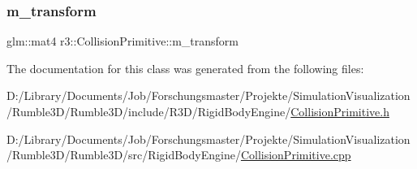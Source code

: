 \subsubsection{\texorpdfstring{m\+\_\+transform}{m\_transform}}
{\footnotesize\ttfamily glm\+::mat4 r3\+::\+Collision\+Primitive\+::m\+\_\+transform\hspace{0.3cm}{\ttfamily [protected]}}



The documentation for this class was generated from the following files\+:\begin{DoxyCompactItemize}
\item 
D\+:/\+Library/\+Documents/\+Job/\+Forschungsmaster/\+Projekte/\+Simulation\+Visualization/\+Rumble3\+D/\+Rumble3\+D/include/\+R3\+D/\+Rigid\+Body\+Engine/\mbox{\hyperlink{_collision_primitive_8h}{Collision\+Primitive.\+h}}\item 
D\+:/\+Library/\+Documents/\+Job/\+Forschungsmaster/\+Projekte/\+Simulation\+Visualization/\+Rumble3\+D/\+Rumble3\+D/src/\+Rigid\+Body\+Engine/\mbox{\hyperlink{_collision_primitive_8cpp}{Collision\+Primitive.\+cpp}}\end{DoxyCompactItemize}
